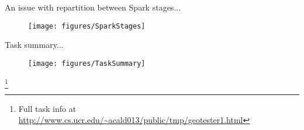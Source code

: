 \documentclass{beamer}
\newcommand\blfootnote[1]{%

  \begingroup

  \renewcommand\thefootnote{}\footnote{#1}%

  \addtocounter{footnote}{-1}%

  \endgroup

}
\begin{document}
\begin{frame}{An issue with repartition between Spark stages...}
    \begin{figure}
        \texttt{[image: figures/SparkStages]}
    \end{figure}
\end{frame}

\begin{frame}{Task summary...}
    \begin{figure}
        \texttt{[image: figures/TaskSummary]}
    \end{figure}
    \blfootnote{\tiny Full task info at \url{http://www.cs.ucr.edu/~acald013/public/tmp/geotester1.html}}
\end{frame}
\end{document}
